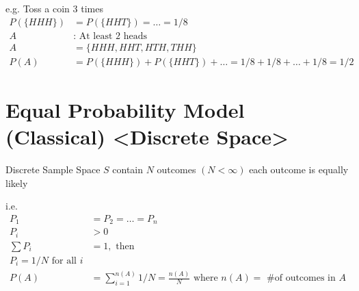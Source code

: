 e.g. Toss a coin 3 times
\begin{align*}
    P( \{ HHH \} ) &= P( \{ HHT \} ) = \ldots = 1/8 \\
    A &: \text{ At least 2 heads} \\
    A &= \{ HHH, HHT, HTH, THH \} \\
    P(A) &= P( \{ HHH \} ) + P( \{ HHT \} ) + \ldots = 1/8 + 1/8 + \ldots + 1/8 = 1/2
\end{align*}

\section*{Equal Probability Model (Classical) <Discrete Space>}
Discrete Sample Space $S$ contain $N$ outcomes $(N < \infty)$ each outcome is equally likely

i.e.
\begin{align*}
    P_1 &= P_2 = \ldots = P_n \\
    P_i &> 0 \\
    \sum P_i &= 1, \text{ then } \\
    P_i = 1/N \text{ for all } i \\
P(A) &= \sum\limits_{i=1}^{n(A)} 1/N = \frac{n(A)}{N} \text{ where } n(A) = \text{ \# of outcomes in } A \\
\end{align*}

